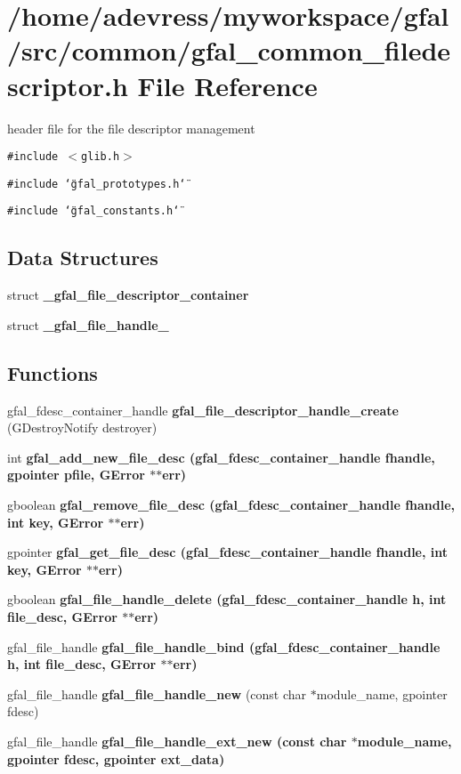 \section{/home/adevress/myworkspace/gfal/src/common/gfal\_\-common\_\-filedescriptor.h File Reference}
\label{gfal__common__filedescriptor_8h}
header file for the file descriptor management 

{\tt \#include $<$glib.h$>$}\par
{\tt \#include \char`\"{}gfal\_\-prototypes.h\char`\"{}}\par
{\tt \#include \char`\"{}gfal\_\-constants.h\char`\"{}}\par
\subsection*{Data Structures}
\begin{CompactItemize}
\item 
struct \textbf{\_\-gfal\_\-file\_\-descriptor\_\-container}
\item 
struct \textbf{\_\-gfal\_\-file\_\-handle\_\-}
\end{CompactItemize}
\subsection*{Functions}
\begin{CompactItemize}
\item 
gfal\_\-fdesc\_\-container\_\-handle \textbf{gfal\_\-file\_\-descriptor\_\-handle\_\-create} (GDestroy\-Notify destroyer)\label{gfal__common__filedescriptor_8h_13934d51ad328aabb0721ef7793ad233}

\item 
int \bf{gfal\_\-add\_\-new\_\-file\_\-desc} (gfal\_\-fdesc\_\-container\_\-handle fhandle, gpointer pfile, GError $\ast$$\ast$err)
\item 
gboolean \bf{gfal\_\-remove\_\-file\_\-desc} (gfal\_\-fdesc\_\-container\_\-handle fhandle, int key, GError $\ast$$\ast$err)
\item 
gpointer \bf{gfal\_\-get\_\-file\_\-desc} (gfal\_\-fdesc\_\-container\_\-handle fhandle, int key, GError $\ast$$\ast$err)
\item 
gboolean \bf{gfal\_\-file\_\-handle\_\-delete} (gfal\_\-fdesc\_\-container\_\-handle h, int file\_\-desc, GError $\ast$$\ast$err)
\item 
gfal\_\-file\_\-handle \bf{gfal\_\-file\_\-handle\_\-bind} (gfal\_\-fdesc\_\-container\_\-handle h, int file\_\-desc, GError $\ast$$\ast$err)
\item 
gfal\_\-file\_\-handle \textbf{gfal\_\-file\_\-handle\_\-new} (const char $\ast$module\_\-name, gpointer fdesc)\label{gfal__common__filedescriptor_8h_5891a96d47726421216140dba73f5e27}

\item 
gfal\_\-file\_\-handle \bf{gfal\_\-file\_\-handle\_\-ext\_\-new} (const char $\ast$module\_\-name, gpointer fdesc, gpointer ext\_\-data)
\end{CompactItemize}


